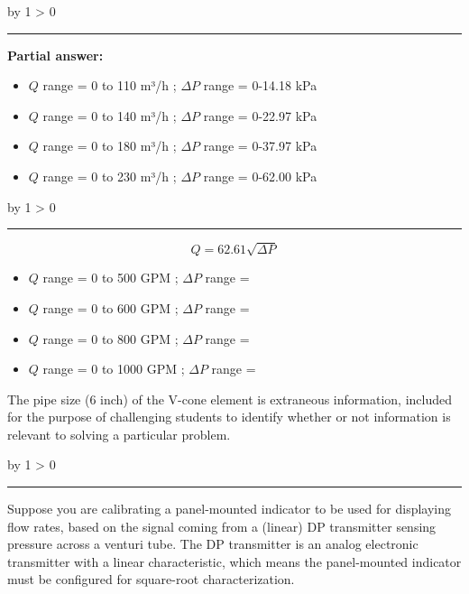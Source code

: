 \documentclass[12pt,a4paper]{article}
\def\oppgave{
            \advance\questnum by 1
            \ifnum \questnum > 0
                 \hrule
                 \vskip 3pt
                 \leftline{Oppgave \the\questnum}
                 \vskip 3pt \fi}
\def\svar{
           \advance\answnum by 1
           \ifnum \answnum > 0
                \hrule
                \vskip 3pt
                \leftline{Svar \the\answnum}
                \vskip 3pt \fi}
\def\notes{
           \advance\explnum by 1
           \ifnum \explnum > 0
                \hrule
                \vskip 3pt
                \leftline{Notes \the\explnum}
                \vskip 3pt \fi}
\begin{document}
\vskip 10pt \filbreak 





\svar{} 

\noindent
{\bf Partial answer:}

\begin{itemize}
\item{} $Q$ range = 0 to 110 m³/h ; $\Delta P$ range = 0-14.18 kPa
\vskip 5pt
\item{} $Q$ range = 0 to 140 m³/h ; $\Delta P$ range = 0-22.97 kPa
\vskip 5pt
\item{} $Q$ range = 0 to 180 m³/h ; $\Delta P$ range = 0-37.97 kPa
\vskip 5pt
\item{} $Q$ range = 0 to 230 m³/h ; $\Delta P$ range = 0-62.00 kPa
\end{itemize}

\vskip 10pt \filbreak 





\notes{} 

$$Q = 62.61 \sqrt{\Delta P}$$

\begin{itemize}
\item{} $Q$ range = 0 to 500 GPM ; $\Delta P$ range = 
\item{} $Q$ range = 0 to 600 GPM ; $\Delta P$ range = 
\item{} $Q$ range = 0 to 800 GPM ; $\Delta P$ range = 
\item{} $Q$ range = 0 to 1000 GPM ; $\Delta P$ range = 
\end{itemize}

\vskip 10pt

The pipe size (6 inch) of the V-cone element is extraneous information, included for the purpose of challenging students to identify whether or not information is relevant to solving a particular problem.



\vfil \eject 


\oppgave{} 

Suppose you are calibrating a panel-mounted indicator to be used for displaying flow rates, based on the signal coming from a (linear) DP transmitter sensing pressure across a venturi tube.  The DP transmitter is an analog electronic transmitter with a linear characteristic, which means the panel-mounted indicator must be configured for square-root characterization.
\end{document}
